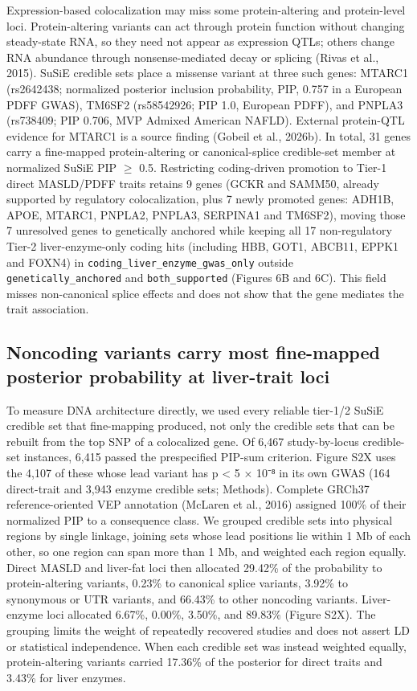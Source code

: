 Expression-based colocalization may miss some protein-altering and protein-level loci. Protein-altering variants can act through protein function without changing steady-state RNA, so they need not appear as expression QTLs; others change RNA abundance through nonsense-mediated decay or splicing (Rivas et al., 2015). SuSiE credible sets place a missense variant at three such genes: MTARC1 (rs2642438; normalized posterior inclusion probability, PIP, 0.757 in a European PDFF GWAS), TM6SF2 (rs58542926; PIP 1.0, European PDFF), and PNPLA3 (rs738409; PIP 0.706, MVP Admixed American NAFLD). External protein-QTL evidence for MTARC1 is a source finding (Gobeil et al., 2026b). In total, 31 genes carry a fine-mapped protein-altering or canonical-splice credible-set member at normalized SuSiE PIP $\ge$ 0.5. Restricting coding-driven promotion to Tier-1 direct MASLD/PDFF traits retains 9 genes (GCKR and SAMM50, already supported by regulatory colocalization, plus 7 newly promoted genes: ADH1B, APOE, MTARC1, PNPLA2, PNPLA3, SERPINA1 and TM6SF2), moving those 7 unresolved genes to genetically anchored while keeping all 17 non-regulatory Tier-2 liver-enzyme-only coding hits (including HBB, GOT1, ABCB11, EPPK1 and FOXN4) in \texttt{coding\_liver\_enzyme\_gwas\_only} outside \texttt{genetically\_anchored} and \texttt{both\_supported} (Figures 6B and 6C). This field misses non-canonical splice effects and does not show that the gene mediates the trait association.

\subsection{Noncoding variants carry most fine-mapped posterior probability at liver-trait loci}\label{noncoding-variants-carry-most-fine-mapped-posterior-probability-at-liver-trait-loci}

To measure DNA architecture directly, we used every reliable tier-1/2 SuSiE credible set that fine-mapping produced, not only the credible sets that can be rebuilt from the top SNP of a colocalized gene. Of 6,467 study-by-locus credible-set instances, 6,415 passed the prespecified PIP-sum criterion. Figure S2X uses the 4,107 of these whose lead variant has p \textless{} 5 × 10⁻⁸ in its own GWAS (164 direct-trait and 3,943 enzyme credible sets; Methods). Complete GRCh37 reference-oriented VEP annotation (McLaren et al., 2016) assigned 100\% of their normalized PIP to a consequence class. We grouped credible sets into physical regions by single linkage, joining sets whose lead positions lie within 1 Mb of each other, so one region can span more than 1 Mb, and weighted each region equally. Direct MASLD and liver-fat loci then allocated 29.42\% of the probability to protein-altering variants, 0.23\% to canonical splice variants, 3.92\% to synonymous or UTR variants, and 66.43\% to other noncoding variants. Liver-enzyme loci allocated 6.67\%, 0.00\%, 3.50\%, and 89.83\% (Figure S2X). The grouping limits the weight of repeatedly recovered studies and does not assert LD or statistical independence. When each credible set was instead weighted equally, protein-altering variants carried 17.36\% of the posterior for direct traits and 3.43\% for liver enzymes.

